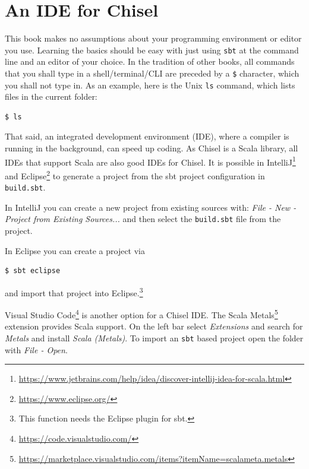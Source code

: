 \documentclass[%
    10pt,
    headinclude, footexclude,
    openright, %
    notitlepage,
    cleardoubleempty,
    headsepline,
    pointlessnumbers,
    bibtotoc, idxtotoc,
    ]{scrbook}
\newcommand{\code}[1]{{\small{\texttt{#1}}}}
\newcommand{\myref}[2]{\href{#1}{#2}}
\renewcommand{\myref}[2]{{#2}{\footnote{\url{#1}}}}
\begin{document}
\section{An IDE for Chisel}

This book makes no assumptions about your programming environment or editor you use.
Learning the basics should be easy with just using \code{sbt} at the command line
and an editor of your choice. In the tradition of other books, all commands that you
shall type in a shell/terminal/CLI are preceded by a \code{\$} character, which you
shall not type in. As an example, here is the Unix \code{ls} command, which lists files in
the current folder:

\begin{verbatim}
$ ls
\end{verbatim}

That said, an integrated development environment (IDE), where a compiler is running in
the background, can speed up coding. As Chisel is a Scala library, all IDEs
that support Scala are also good IDEs for Chisel.
It is possible in
\myref{https://www.jetbrains.com/help/idea/discover-intellij-idea-for-scala.html}{IntelliJ} and
 \myref{https://www.eclipse.org/}{Eclipse}
to generate a project from the sbt project configuration in \code{build.sbt}.

In IntelliJ you can create a new project from existing sources with:
\emph{File - New - Project from Existing Sources...} and then select the \code{build.sbt}
file from the project.

In Eclipse you can create a project via
\begin{verbatim}
$ sbt eclipse
\end{verbatim}
and import that project into Eclipse.\footnote{This function needs the Eclipse plugin for sbt.}

\myref{https://code.visualstudio.com/}{Visual Studio Code} is another option for a Chisel IDE. 
The \myref{https://marketplace.visualstudio.com/items?itemName=scalameta.metals}{Scala Metals}
extension provides Scala support.
On the left bar select \emph{Extensions} and search for \emph{Metals} and install \emph{Scala (Metals)}.
To import an \code{sbt} based project open the folder with \emph{File - Open}. 

\end{document}
